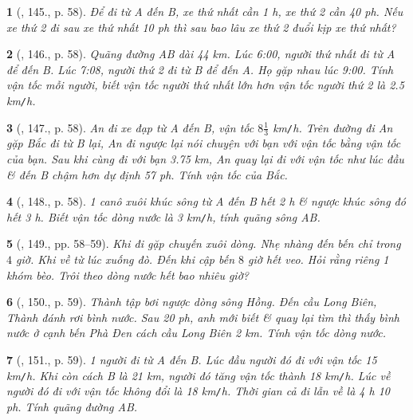 \documentclass{article}
\newtheorem{baitoan}{}
\begin{document}
\begin{baitoan}[\cite{Binh_Toan_6_tap_2}, 145., p. 58]
	Để đi từ A đến B, xe thứ nhất cần {\rm1 h}, xe thứ 2 cần {\rm40 ph}. Nếu xe thứ 2 đi sau xe thứ nhất {\rm10 ph} thì sau bao lâu xe thứ 2 đuổi kịp xe thứ nhất?
\end{baitoan}

\begin{baitoan}[\cite{Binh_Toan_6_tap_2}, 146., p. 58]
	Quãng đường AB dài {\rm44 km}. Lúc {\rm6:00}, người thứ nhất đi từ A để đến B. Lúc {\rm7:08}, người thứ 2 đi từ B để đến A. Họ gặp nhau lúc {\rm9:00}. Tính vận tốc mỗi người, biết vận tốc người thứ nhất lớn hơn vận tốc người thứ 2 là {\rm2.5 km{\tt/}h}.
\end{baitoan}

\begin{baitoan}[\cite{Binh_Toan_6_tap_2}, 147., p. 58]
	An đi xe đạp từ A đến B, vận tốc $8\frac{1}{3}$ {\rm km{\tt/}h}. Trên đường đi An gặp Bắc đi từ B lại, An đi ngược lại nói chuyện với bạn với vận tốc bằng vận tốc của bạn. Sau khi cùng đi với bạn {\rm3.75 km}, An quay lại đi với vận tốc như lúc đầu \& đến B chậm hơn dự định {\rm57 ph}. Tính vận tốc của Bắc.
\end{baitoan}

\begin{baitoan}[\cite{Binh_Toan_6_tap_2}, 148., p. 58]
	1 canô xuôi khúc sông từ A đến B hết {\rm2 h} \& ngược khúc sông đó hết {\rm3 h}. Biết vận tốc dòng nước là {\rm3 km{\tt/}h}, tính quãng sông AB.
\end{baitoan}

\begin{baitoan}[\cite{Binh_Toan_6_tap_2}, 149., pp. 58--59]
	Khi đi gặp chuyến xuôi dòng. Nhẹ nhàng đến bến chỉ trong $4$ giờ. Khi về từ lúc xuống đò. Đến khi cập bến $8$ giờ hết veo. Hỏi rằng riêng 1 khóm bèo. Trôi theo dòng nước hết bao nhiêu giờ?
\end{baitoan}

\begin{baitoan}[\cite{Binh_Toan_6_tap_2}, 150., p. 59]
	Thành tập bơi ngược dòng sông Hồng. Đến cầu Long Biên, Thành đánh rơi bình nước. Sau {\rm20 ph}, anh mới biết \& quay lại tìm thì thấy bình nước ở cạnh bến Phà Đen cách cầu Long Biên {\rm2 km}. Tính vận tốc dòng nước.
\end{baitoan}

\begin{baitoan}[\cite{Binh_Toan_6_tap_2}, 151., p. 59]
	1 người đi từ A đến B. Lúc đầu người đó đi với vận tốc {\rm15 km{\tt/}h}. Khi còn cách B là {\rm21 km}, người đó tăng vận tốc thành {\rm18 km{\tt/}h}. Lúc về người đó đi với vận tốc không đổi là {\rm18 km{\tt/}h}. Thời gian cả đi lẫn về là {\rm4 h 10 ph}. Tính quãng đường AB.
\end{baitoan}
\end{document}
